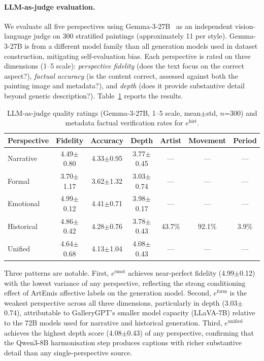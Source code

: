 \paragraph{LLM-as-judge evaluation.}
We evaluate all five perspectives using Gemma-3-27B~\cite{gemma3} as an independent vision-language judge on 300 stratified paintings (approximately 11 per style).
Gemma-3-27B is from a different model family than all generation models used in dataset construction, mitigating self-evaluation bias.
Each perspective is rated on three dimensions (1--5 scale): \textit{perspective fidelity} (does the text focus on the correct aspect?), \textit{factual accuracy} (is the content correct, assessed against both the painting image and metadata?), and \textit{depth} (does it provide substantive detail beyond generic description?).
Table~\ref{tab:quality} reports the results.

\begin{table}[h]
\centering
\caption{LLM-as-judge quality ratings (Gemma-3-27B, 1--5 scale, mean$\pm$std, $n$=300) and metadata factual verification rates for $e^{\text{hist}}$.}
\label{tab:quality}
\setlength{\tabcolsep}{4pt}
\begin{tabular}{lcccccc}
\toprule
\textbf{Perspective} & \textbf{Fidelity} & \textbf{Accuracy} & \textbf{Depth} & \textbf{Artist} & \textbf{Movement} & \textbf{Period} \\
\midrule
Narrative  & 4.49$\pm$0.80 & 4.33$\pm$0.95 & 3.77$\pm$0.45 & — & — & — \\
Formal     & 3.70$\pm$1.17 & 3.62$\pm$1.32 & 3.03$\pm$0.74 & — & — & — \\
Emotional  & 4.99$\pm$0.12 & 4.41$\pm$0.71 & 3.98$\pm$0.17 & — & — & — \\
Historical & 4.86$\pm$0.42 & 4.28$\pm$0.76 & 3.78$\pm$0.43 & 43.7\% & 92.1\% & 3.9\% \\
Unified    & 4.64$\pm$0.68 & 4.13$\pm$1.04 & 4.08$\pm$0.43 & — & — & — \\
\bottomrule
\end{tabular}
\end{table}

Three patterns are notable.
First, $e^{\text{emot}}$ achieves near-perfect fidelity (4.99$\pm$0.12) with the lowest variance of any perspective, reflecting the strong conditioning effect of ArtEmis affective labels on the generation model.
Second, $e^{\text{form}}$ is the weakest perspective across all three dimensions, particularly in depth (3.03$\pm$0.74), attributable to GalleryGPT's smaller model capacity (LLaVA-7B) relative to the 72B models used for narrative and historical generation.
Third, $e^{\text{unified}}$ achieves the highest depth score (4.08$\pm$0.43) of any perspective, confirming that the Qwen3-8B harmonisation step produces captions with richer substantive detail than any single-perspective source.

